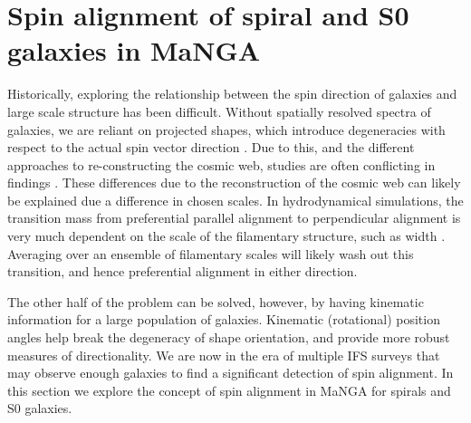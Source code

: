 \section{Spin alignment of spiral and S0 galaxies in MaNGA} \label{sec:spin_alignment}
Historically, exploring the relationship between the spin direction of galaxies and large scale structure has been difficult. Without spatially resolved spectra of galaxies, we are reliant on projected shapes, which introduce degeneracies with respect to the actual spin vector direction \citep[e.g. see Fig 2. in][for example of degeneracies that can occur]{motloch2020}. Due to this, and the different approaches to re-constructing the cosmic web, studies are often conflicting in findings \citep[e.g. spiral galaxies having parallel vs perpendicular orientations with respect to the cosmic web][]{tempel2013a, tempel2013, lee2007, jones2010, zhang2015}. These differences due to the reconstruction of the cosmic web can likely be explained due a difference in chosen scales. In hydrodynamical simulations, the transition mass from preferential parallel alignment to perpendicular alignment is very much dependent on the scale of the filamentary structure, such as width \citep{ganeshaiahveena2019, Kraljic2019flip}. Averaging over an ensemble of filamentary scales will likely wash out this transition, and hence preferential alignment in either direction. 

The other half of the problem can be solved, however, by having kinematic information for a large population of galaxies. Kinematic (rotational) position angles help break the degeneracy of shape orientation, and provide more robust measures of directionality. We are now in the era of multiple IFS surveys that may observe enough galaxies to find a significant detection of spin alignment. In this section we explore the concept of spin alignment in MaNGA for spirals and S0 galaxies.

